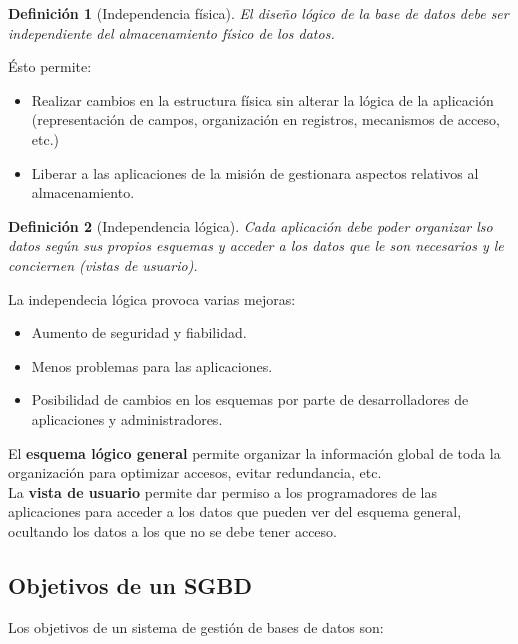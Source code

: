 \documentclass[12pt,spanish]{article}
\newtheorem{definition}{Definición}
\begin{document}
\begin{definition}[Independencia física]
	El diseño lógico de la base de datos debe ser independiente del almacenamiento físico de los datos.
\end{definition}

Ésto permite:

\begin{itemize}
	\item Realizar cambios en la estructura física sin alterar la lógica de la aplicación (representación de campos, organización en registros, mecanismos de acceso, etc.)
	\item Liberar a las aplicaciones de la misión de gestionara aspectos relativos al almacenamiento.
\end{itemize}

\begin{definition}[Independencia lógica]
	Cada aplicación debe poder organizar lso datos según sus propios esquemas y acceder a los datos que le son necesarios y le conciernen (vistas de usuario).
\end{definition}

La independecia lógica provoca varias mejoras:
\begin{itemize}
	\item Aumento de seguridad y fiabilidad.
	\item Menos problemas para las aplicaciones.
	\item Posibilidad de cambios en los esquemas por parte de desarrolladores de aplicaciones y administradores.
\end{itemize}

El \textbf{esquema lógico general} permite organizar la información global de toda la organización para optimizar accesos, evitar redundancia, etc.\\

La \textbf{vista de usuario} permite dar permiso a los programadores de las aplicaciones para acceder a los datos que pueden ver del esquema general, ocultando los datos a los que no se debe tener acceso.\\

\subsection{Objetivos de un SGBD}

Los objetivos de un sistema de gestión de bases de datos son:
\end{document}
